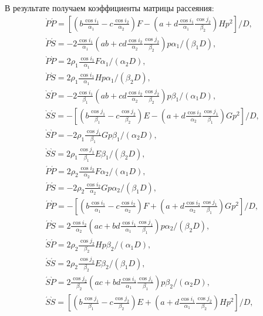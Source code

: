 В результате получаем коэффициенты матрицы рассеяния:
\begin{eqnarray}
\grave{P}\acute{P} = [ ( b\frac{\cos{i_1}}{\alpha_1} - c\frac{\cos{i_2}}{\alpha_2} )F - ( a + d\frac{\cos{i_1}}{\alpha_1}\frac{\cos{j_2}}{\beta_2} )Hp^2 ] / D, \nonumber\\
\grave{P}\acute{S} = -2 \frac{\cos{i_1}}{\alpha_1} (ab + cd \frac{\cos{i_2}}{\alpha_2} \frac{\cos{j_2}}{\beta_2} ) p \alpha_1 / (\beta_1 D), \nonumber\\
\grave{P}\grave{P} = 2 \rho_1 \frac{\cos{i_1}}{\alpha_1} F \alpha_1 / (\alpha_2 D), \nonumber\\
\grave{P}\grave{S} = 2 \rho_1 \frac{\cos{i_1}}{\alpha_1} H p \alpha_1 / (\beta_2 D), \nonumber\\
\grave{S}\acute{P} = -2 \frac{\cos{i_1}}{\beta_1} (ab + cd \frac{\cos{i_2}}{\alpha_2} \frac{\cos{j_2}}{\beta_2} ) p \beta_1 / (\alpha_1 D), \nonumber\\
\grave{S}\acute{S} = - [ ( b\frac{\cos{j_1}}{\beta_1} - c\frac{\cos{j_2}}{\beta_2} )E - ( a + d\frac{\cos{i_2}}{\alpha_2}\frac{\cos{j_1}}{\beta_1} )Gp^2 ] / D, \nonumber\\
\grave{S}\grave{P} = - 2 \rho_1 \frac{\cos{j_1}}{\beta_1} Gp \beta_1 / (\alpha_2 D), \nonumber\\
\grave{S}\grave{S} = 2 \rho_1 \frac{\cos{j_1}}{\beta_1} E \beta_1 / (\beta_2 D), \nonumber\\
\acute{P}\acute{P} = 2 \rho_2 \frac{\cos{i_2}}{\alpha_2} F \alpha_2 / (\alpha_1 D), \nonumber\\
\acute{P}\acute{S} = - 2 \rho_2 \frac{\cos{i_2}}{\alpha_2} Gp \alpha_2 / (\beta_1 D), \nonumber\\
\acute{P}\grave{P} = - [ ( b\frac{\cos{i_1}}{\alpha_1} - c\frac{\cos{i_2}}{\alpha_2} )F + ( a + d\frac{\cos{i_2}}{\alpha_2}\frac{\cos{j_1}}{\beta_1} )Gp^2 ] / D, \nonumber\\
\acute{P}\grave{S} = 2 \frac{\cos{i_2}}{\alpha_2} (ac + bd \frac{\cos{i_1}}{\alpha_1} \frac{\cos{j_1}}{\beta_1} ) p \alpha_2 / (\beta_2 D), \nonumber\\
\acute{S}\acute{P} = 2 \rho_2 \frac{\cos{j_2}}{\beta_2} Hp \beta_2 / (\alpha_1 D), \nonumber\\
\acute{S}\acute{S} = 2 \rho_2 \frac{\cos{j_2}}{\beta_2} E \beta_2 / (\beta_1 D), \nonumber\\
\acute{S}\grave{P} = 2 \frac{\cos{j_2}}{\beta_2} (ac + bd \frac{\cos{i_1}}{\alpha_1} \frac{\cos{j_1}}{\beta_1} ) p \beta_2 / (\alpha_2 D), \nonumber\\
\acute{S}\grave{S} = [ ( b\frac{\cos{j_1}}{\beta_1} - c\frac{\cos{j_2}}{\beta_2} )E + ( a + d\frac{\cos{i_1}}{\alpha_1}\frac{\cos{j_2}}{\beta_2} )Hp^2 ] / D,
\end{eqnarray}

